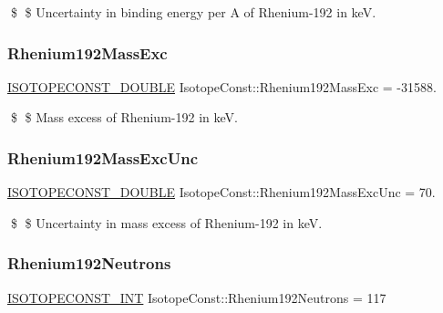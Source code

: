 \$ \$ Uncertainty in binding energy per A of Rhenium-\/192 in keV. \mbox{\label{group___isotope_const-_rhenium-_re192_ga447d87caf4ed0c49d38d9953239d0ca1}} 
\subsubsection{\texorpdfstring{Rhenium192\+Mass\+Exc}{Rhenium192MassExc}}
{\footnotesize\ttfamily \mbox{\hyperlink{group___isotope_const-_macros_ga8f45a7272ce02c0b4c65c44636ed719a}{I\+S\+O\+T\+O\+P\+E\+C\+O\+N\+S\+T\+\_\+\+D\+O\+U\+B\+LE}} Isotope\+Const\+::\+Rhenium192\+Mass\+Exc = -\/31588.}

\$ \$ Mass excess of Rhenium-\/192 in keV. \mbox{\label{group___isotope_const-_rhenium-_re192_ga76bc1156604c7c441a1be828c80fa57f}} 
\subsubsection{\texorpdfstring{Rhenium192\+Mass\+Exc\+Unc}{Rhenium192MassExcUnc}}
{\footnotesize\ttfamily \mbox{\hyperlink{group___isotope_const-_macros_ga8f45a7272ce02c0b4c65c44636ed719a}{I\+S\+O\+T\+O\+P\+E\+C\+O\+N\+S\+T\+\_\+\+D\+O\+U\+B\+LE}} Isotope\+Const\+::\+Rhenium192\+Mass\+Exc\+Unc = 70.}

\$ \$ Uncertainty in mass excess of Rhenium-\/192 in keV. \mbox{\label{group___isotope_const-_rhenium-_re192_gabe4ded671321519e439c54f6db7f8915}} 
\subsubsection{\texorpdfstring{Rhenium192\+Neutrons}{Rhenium192Neutrons}}
{\footnotesize\ttfamily \mbox{\hyperlink{group___isotope_const-_macros_ga5f18360b3e99483a35c32d789e62621c}{I\+S\+O\+T\+O\+P\+E\+C\+O\+N\+S\+T\+\_\+\+I\+NT}} Isotope\+Const\+::\+Rhenium192\+Neutrons = 117}

